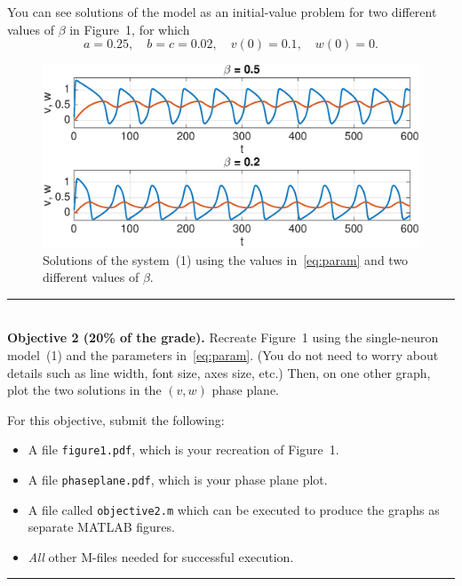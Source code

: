 \documentclass[11pt,letterpaper]{article}
\begin{document}
You can see solutions of the model as an initial-value problem for two different values of $\beta$ in Figure~1, for which
\begin{equation}
  \label{eq:param}
  a=0.25,\quad b=c=0.02, \quad   v(0)=0.1,\quad w(0)=0.
\end{equation}


\begin{figure}[bt]
  \centering
  \includegraphics[width=\textwidth]{FHexample}
  \caption{Solutions of the system~(1) using the values in~\eqref{eq:param} and two different values of $\beta$.}
  \label{fig:fh}
\end{figure}

\hfill \rule{4in}{1pt} \hspace*{\fill}\\

\noindent \textbf{Objective 2 (20\% of the grade).}  Recreate Figure~1 using the single-neuron model~(1) and the parameters in~\eqref{eq:param}. (You do not need to worry about details such as line width, font size, axes size, etc.) Then, on one other graph, plot the two solutions in the $(v,w)$ phase plane.

For this objective, submit the following:
\begin{itemize}
\item A file \texttt{figure1.pdf}, which is your recreation of
  Figure~1.
\item A file \texttt{phaseplane.pdf}, which is your phase plane plot. 
\item A file called \texttt{objective2.m} which can be executed to
  produce the graphs as separate MATLAB figures.
\item \textit{All} other M-files needed for successful execution.
\end{itemize}

\hfill \rule{4in}{1pt} \hspace*{\fill}\\
\end{document}
